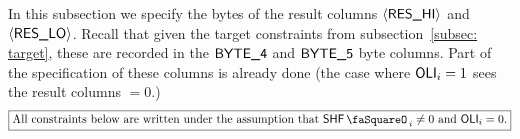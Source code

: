 In this subsection we specify the bytes of the result columns $\langle{}\textsf{RES}\textsf{\_HI}\rangle{}$ and $\langle{}\textsf{RES}\textsf{\_LO}\rangle{}$.
Recall that given the target constraints from subsection~\ref{subsec: target}, these are recorded in the $\textsf{BYTE}\textsf{\_4}$ and $\textsf{BYTE}\textsf{\_5}$ byte columns.
Part of the specification of these columns is already done (the case where $\textsf{OLI}_{i} = 1$ sees the result columns $=0$.)
\[
	\boxed{\text{All constraints below are written under the assumption that }\shfStamp_{i}\neq 0\text{ and }\oli_{i} = 0.}
\]

